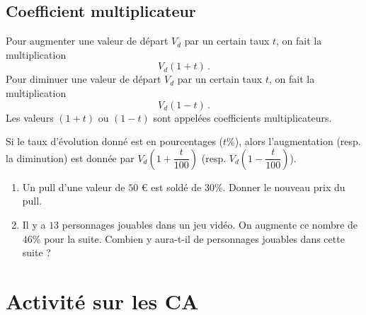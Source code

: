 \documentclass{article}
\begin{document}
\subsection*{Coefficient multiplicateur}
\begin{proposition}
Pour augmenter une valeur de départ $V_d$ par un certain taux $t$, on fait la multiplication
    \begin{equation*}
        V_d (1 + t)\,.    
\end{equation*}
Pour diminuer une valeur de départ $V_d$ par un certain taux $t$, on fait la multiplication
\begin{equation*}
    V_d (1 - t)\,.
\end{equation*}
Les valeurs $(1 + t)$ ou $(1 - t)$ sont appelées coefficients multiplicateurs.
\end{proposition}
\begin{remark}
Si le taux d'évolution donné est en pourcentages ($t \%$), alors l'augmentation (resp. la diminution) est donnée par $V_d (1 + \dfrac{t}{100})$ (resp. $V_d (1 - \dfrac{t}{100})$).
\end{remark}
\begin{example}
\begin{enumerate}
\item Un pull d'une valeur de $50$ \euro{} est soldé de $30 \%$. Donner le nouveau prix du pull.
\item Il y a $13$ personnages jouables dans un jeu vidéo. On augmente ce nombre de $46\%$ pour la suite. Combien y aura-t-il de personnages jouables dans cette suite ?
\end{enumerate}
\end{example}
\section{Activité sur les CA}
\end{document}
